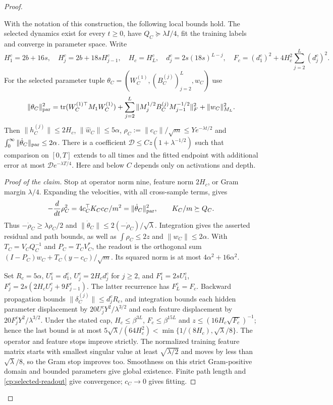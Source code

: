 \begin{proof}
\begin{claim}
\label{cp:selected-fitting}
With the notation of this construction, the following local bounds hold.
The selected dynamics exist for every $t\ge0$, have $Q_C\succeq\lambda I/4$,
fit the training labels and converge in parameter space. Write
\[
 H_1^c=2b+16s,\quad H_j^c=2b+18sH_{j-1}^c,\quad H_c=H_L^c,
 \quad d_j^c=2s(18s)^{L-j},\quad
 F_c=(d_1^c)^2+4H_c^2\sum_{j=2}^L(d_j^c)^2.
\]
For the selected parameter tuple
$\theta_C=(W_C^{(1)},(B_C^{(j)})_{j=2}^L,w_C)$ use
\[
 \|\theta_C\|_{\rm par}^2=
 \operatorname{tr}(W_C^{(1)\top}M_1W_C^{(1)})+
 \sum_{j=2}^L\|M_j^{1/2}B_C^{(j)}M_{j-1}^{-1/2}\|_F^2+
 \|w_C\|_{M_L}^2.
\]
Then $\|h_C^{(j)}\|\le2H_c$, $\|\widehat w_C\|\le5\alpha$,
$\rho_C:=\|c_C\|/\sqrt m\le Ye^{-\lambda t/2}$ and
$\int_0^\infty\|\dot\theta_C\|_{\rm par}\le2\alpha$.
There is a coefficient $\mathcal D\le C z(1+\lambda^{-1/2})$ such that
comparison on $[0,T]$ extends to all times and the fitted endpoint with
additional error at most $\mathcal D e^{-\lambda T/4}$.
Here and below $C$ depends only on activations and depth.
\end{claim}
\begin{proof}[Proof of the claim]
Stop at operator norm nine, feature norm $2H_c$, or Gram margin $\lambda/4$.
Expanding the velocities, with all cross-sample terms, gives
\begin{equation}
 -\frac d{dt}\rho_C^2=4c_C^\top K_Cc_C/m^2
       =\|\dot\theta_C\|_{\rm par}^2,
 \qquad K_C/m\succeq Q_C.
 \label{cp:selected-energy}
\end{equation}
Thus $-\dot\rho_C\ge\lambda\rho_C/2$ and
$\|\dot\theta_C\|\le2(-\dot\rho_C)/\sqrt\lambda$.
Integration gives the asserted residual and path bounds, as well as
$\int\rho_C\le2z$ and $\|w_C\|\le2\alpha$.
With $T_C=V_CQ_C^{-1}$ and $P_C=T_CV_C^*$, the readout is the
orthogonal sum $(I-P_C)w_C+T_C(y-c_C)/\sqrt m$.
Its squared norm is at most $4\alpha^2+16\alpha^2$.

Set $R_c=5\alpha$, $U_1^c=d_1^c$, $U_j^c=2H_cd_j^c$ for $j\ge2$,
and $F_1^c=2sU_1^c$, $F_j^c=2s(2H_cU_j^c+9F_{j-1}^c)$.
The latter recurrence has $F_L^c=F_c$. Backward propagation bounds
$\|\delta_C^{(j)}\|\le d_j^cR_c$, and integration bounds each hidden
parameter displacement by $20U_j^cY^2/\lambda^{3/2}$ and each feature
displacement by $20F_j^cY^2/\lambda^{3/2}$.
Under the stated cap, $H_c\le\beta^{3L}$, $F_c\le\beta^{15L}$ and
$z\le(16H_c\sqrt{F_c})^{-1}$; hence the last bound is at most
$5\sqrt\lambda/(64H_c^2)<\min\{1/(8H_c),\sqrt\lambda/8\}$.
The operator and feature stops improve strictly. The normalized training
feature matrix starts with smallest singular value at least
$\sqrt{\lambda/2}$ and moves by less than $\sqrt\lambda/8$, so the
Gram stop improves too. Smoothness on this strict Gram-positive domain
and bounded parameters give global existence. Finite path length and
\eqref{cp:selected-readout} give convergence; $c_C\to0$ gives fitting.


\end{proof}
\end{proof}
